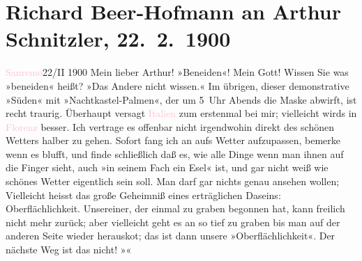 

               \section[Richard Beer-Hofmann an Arthur Schnitzler, 22. 2. 1900]{ Richard Beer-Hofmann an Arthur Schnitzler, 22. 2. 1900}\nopagebreak{}\rehead{ }\normalsize\beginnumbering{} \toendnotes[C]{\smallbreak\pagebreak[2]} 
\toendnotes[C]{\smallbreak}\pstart
           \raggedleft{}{\pb}\textcolor{pink}{Sanremo}{}\ledrightnote{\textcolor{pink}{Sanremo}}{ }22/II 1900\pend
           \pstart
           Mein lieber Arthur! »Beneiden«! Mein Gott! Wissen Sie was »beneiden«
               heißt? »Das Andere nicht wissen.« Im übrigen, dieser demonstrative »Süden« mit
               »Nachtkastel-Palmen«, der um 5 Uhr Abends die Maske abwirft, ist recht traurig.
               Überhaupt versagt \textcolor{pink}{Italien}{}\ledrightnote{\textcolor{pink}{Italien}} zum erstenmal bei mir;
               vielleicht wirds in \textcolor{pink}{Florenz}{}\ledrightnote{\textcolor{pink}{Florenz}} besser. Ich vertrage es
               offenbar nicht irgendwohin direkt des schönen Wetters halber zu gehen. Sofort fang
               ich an aufs Wetter aufzupassen, bemerke wenn es blufft, und finde schließlich daß es,
               wie alle Dinge wenn man ihnen auf die Finger sieht, auch »in seinem Fach ein Esel«
               ist, und gar nicht weiß wie schönes Wetter eigentlich sein soll. Man darf gar nichts
               genau ansehen wollen; {\pb}Vielleicht
               heisst das große Geheimniß eines erträglichen Daseins: Oberflächlichkeit. Unsereiner,
               der einmal zu graben begonnen hat, kann freilich nicht mehr zurück; aber vielleicht
               geht es an so tief zu graben bis man auf der anderen Seite wieder herausko{\geminationm}t; das ist dann unsere »Oberflächlichkeit«. Der nächste
               Weg ist das nicht! »\label{K_L01016_1v}\label{K_L01016_1h}«\pend
